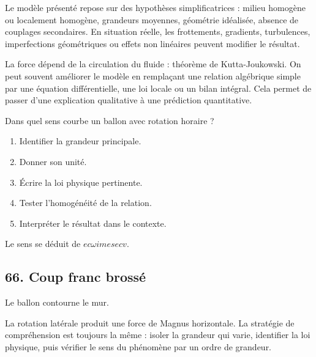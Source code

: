 \documentclass[11pt,a4paper]{article}
\begin{document}
\begin{attentionbox}
Le modèle présenté repose sur des hypothèses simplificatrices : milieu homogène ou localement homogène, grandeurs moyennes, géométrie idéalisée, absence de couplages secondaires. En situation réelle, les frottements, gradients, turbulences, imperfections géométriques ou effets non linéaires peuvent modifier le résultat.
\end{attentionbox}

\begin{approfondissementbox}
La force dépend de la circulation du fluide : théorème de Kutta-Joukowski.
On peut souvent améliorer le modèle en remplaçant une relation algébrique simple par une équation différentielle, une loi locale ou un bilan intégral. Cela permet de passer d'une explication qualitative à une prédiction quantitative.
\end{approfondissementbox}

\begin{exercicebox}
Dans quel sens courbe un ballon avec rotation horaire ?
\begin{enumerate}
  \item Identifier la grandeur principale.
  \item Donner son unité.
  \item Écrire la loi physique pertinente.
  \item Tester l'homogénéité de la relation.
  \item Interpréter le résultat dans le contexte.
\end{enumerate}
\end{exercicebox}

\begin{corrigebox}[Indication]
Le sens se déduit de $
ec\omega	imes
ec v$.
\end{corrigebox}


\subsection{66. Coup franc brossé}

\begin{exemplebox}
Le ballon contourne le mur.
\end{exemplebox}

\begin{methodebox}
La rotation latérale produit une force de Magnus horizontale.
La stratégie de compréhension est toujours la même : isoler la grandeur qui varie, identifier la loi physique, puis vérifier le sens du phénomène par un ordre de grandeur.
\end{methodebox}
\end{document}
